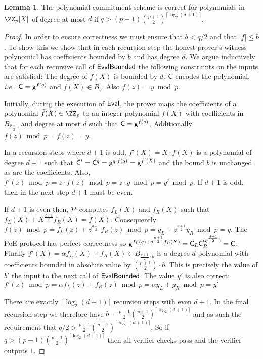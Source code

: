 \documentclass{article}
\theoremstyle{definition}
\newtheorem{lemma}{Lemma}
\begin{document}
\begin{lemma}
\label{lem:correctness}
	The polynomial commitment scheme is correct for polynomials in $\ZZ_p[X]$ of degree at most $d$ if $q> (p-1) (\frac{p+1}{2})^{\lceil \log_2(d+1)\rceil}$.
\end{lemma}
\begin{proof}
In order to ensure correctness we must ensure that $b< q/2$ and that $|f|\leq b$. To show this we show that in each recursion step the honest prover's witness polynomial has coefficients bounded by $b$ and has degree $d$. 
We argue inductively that for each recursive call of $\textsf{{EvalBounded}}$ the following constraints on the inputs are satisfied: The degree of $f(X)$ is bounded by $d$. $\mathsf{C}$ encodes the polynomial, \emph{i.e.}, $\mathsf{C}=\mathsf{g}^{f(q)}$ and $f(X)\in B_b$. Also $f(z) = y\bmod p$.

Initially, during the execution of $\textsf{{Eval}}$, the prover maps the coefficients of a polynomial $\bar{f}(X)\in \ZZ_p$ to an integer polynomial $f(X)$ with coefficients in $B_{\frac{p+1}{2}}$ and degree at most $d$ such that $\mathsf{C}=\mathsf{g}^{f(q)}$. Additionally $f(z)\bmod p=\bar{f}(z)=y$.

 In a recursion steps where $d+1$ is odd, $f'(X)=X\cdot f(X)$ is a polynomial of degree $d+1$ such that $\mathsf{C}'=\mathsf{C}^q=\mathsf{g}^{q\cdot f(q)}=\mathsf{g}^{f'(X)}$ and the bound $b$ is unchanged as are the coefficients. Also, $f'(z)\bmod p = z \cdot f(z) \bmod p=z\cdot y\bmod p = y' \bmod p$. If $d+1$ is odd, then in the next step $d+1$ must be even.
 
 If $d+1$ is even then, $\mathcal{P}$ computes $f_L(X)$ and $f_R(X)$ such that $f_L(X)+X^{\frac{d+1}{2}} f_R(X)=f(X)$. Consequently $f(z) \bmod p=f_L(z)+ z^{\frac{d+1}{2}} f_R(z)\bmod p=y_L+z^{\frac{d+1}{2}}  y_R\bmod p =y$. The \textsf{PoE} protocol has perfect correctness so $\mathsf{g}^{f_L(q)+q^{\frac{d+1}{2}} f_R(X)}=\mathsf{C}_L\mathsf{C}_R^{(q^{\frac{d+1}{2}})}=\mathsf{C}$.
 Finally $f'(X)=\alpha f_L(X) + f_R(X)\in B_{\frac{p+1}{2}\cdot b}$ is a degree $d$ polynomial with coefficients bounded in absolute value by $(\frac{p+1}{2})\cdot b$. This is precisely the value of $b'$ the input to the next call of $\textsf{{EvalBounded}}$. The value $y'$ is also correct:
$f'(z)\bmod p=\alpha f_L(z) +f_R(z) \bmod p= \alpha y_L +y_R\bmod p=y'$
 
 There are exactly $\lceil\log_2(d+1)\rceil$ recursion steps with even $d+1$. In the final recursion step we therefore have $b=\frac{p-1}{2}(\frac{p+1}{2})^{\lceil\log_2(d+1)\rceil}$ and as such the requirement that $q/2>\frac{p-1}{2}(\frac{p+1}{2})^{\lceil\log_2(d+1)\rceil}$. 
 So if $q>(p-1) (\frac{p+1}{2})^{\lceil \log_2(d+1)\rceil}$ then all verifier checks pass and the verifier outputs $1$.
\end{proof} 
 
\end{document}
